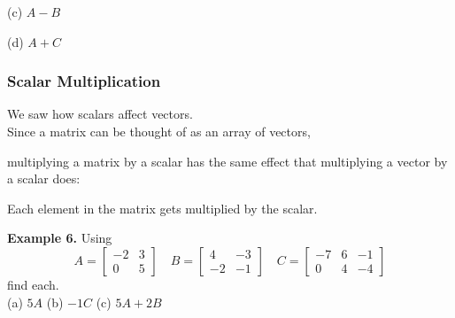 \documentclass{article}
\begin{document}
(c) \quad $A - B$ \newline\\
\vfill

(d) \quad $A + C$ \newline\\
\vfill 

\newpage

\subsubsection*{Scalar Multiplication}

We saw how scalars affect vectors. \newline\\

Since a matrix can be thought of as an array of vectors,

multiplying a matrix by a scalar has the same effect that multiplying a vector by a scalar does:  

\begin{center}
Each element in the matrix gets multiplied by the scalar.\end{center}

{\color{red}\textbf{Example 6.}} Using \[
A = \begin{bmatrix}
-2 & 3 \\
0 & 5 
\end{bmatrix}
\quad
B = \begin{bmatrix}
4 & -3 \\
-2 & -1
\end{bmatrix}
\quad
C = \begin{bmatrix}
-7 & 6 & -1 \\
0 & 4 & -4 
\end{bmatrix}
\]
find each.  \newline\\

(a) \quad $5A$  \vfill 
(b) \quad $-1C$ \vfill 
(c) \quad $5A + 2B$ \vfill 
 
\end{document}
